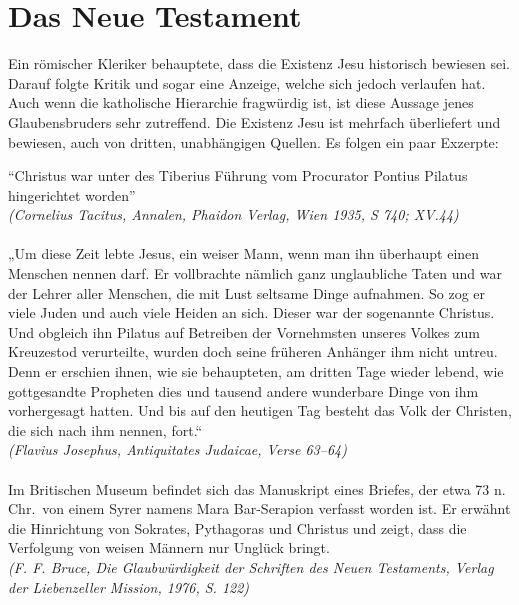 \chapter{Das Neue Testament}
Ein römischer Kleriker behauptete, dass die Existenz Jesu historisch bewiesen sei. Darauf folgte Kritik und sogar eine Anzeige, welche sich jedoch verlaufen hat. Auch wenn die katholische Hierarchie fragwürdig ist, ist diese  Aussage jenes Glaubensbruders sehr zutreffend. Die Existenz Jesu ist mehrfach überliefert und bewiesen, auch von dritten, unabhängigen Quellen. Es folgen ein paar Exzerpte:
\medskip
\begin{center}
    \begin{minipage}{0.9\linewidth}
        \small
        ``Christus war unter des Tiberius Führung vom Procurator Pontius Pilatus hingerichtet worden''
        \\ \footnotesize{\textit{(Cornelius Tacitus, Annalen, Phaidon Verlag, Wien 1935, S 740; XV.\@ 44)}}\small
        \\~\\
        „Um diese Zeit lebte Jesus, ein weiser Mann, wenn man ihn überhaupt einen Menschen nennen darf. Er vollbrachte nämlich ganz unglaubliche Taten und war der Lehrer aller Menschen, die mit Lust seltsame Dinge aufnahmen. So zog er viele Juden und auch viele Heiden an sich. Dieser war der sogenannte Christus. Und obgleich ihn Pilatus auf Betreiben der Vornehmsten unseres Volkes zum Kreuzestod verurteilte, wurden doch seine früheren Anhänger ihm nicht untreu. Denn er erschien ihnen, wie sie behaupteten, am dritten Tage wieder lebend, wie gottgesandte Propheten dies und tausend andere wunderbare Dinge von ihm vorhergesagt hatten. Und bis auf den heutigen Tag besteht das Volk der Christen, die sich nach ihm nennen, fort.“
        \\ \footnotesize \textit{(Flavius Josephus, Antiquitates Judaicae, Verse 63–64)} \small
        \\~\\
        Im Britischen Museum befindet sich das Manuskript eines Briefes, der etwa 73 n. Chr.\ von einem Syrer namens Mara Bar-Serapion verfasst worden ist. Er erwähnt die Hinrichtung von Sokrates, Pythagoras und Christus und zeigt, dass die Verfolgung von weisen Männern nur Unglück bringt.
        \\ \footnotesize \textit{(F. F. Bruce, Die Glaubwürdigkeit der Schriften des Neuen Testaments, Verlag der Liebenzeller Mission, 1976, S. 122)} \small
        \\~\\

\end{minipage}
\end{center}
